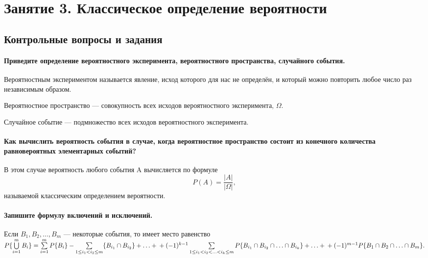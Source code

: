 \chapter*{Занятие 3. Классическое определение вероятности}

\section*{Контрольные вопросы и задания}

\subsubsection*{Приведите определение вероятностного эксперимента, вероятностного пространства, случайного события.}

Вероятностным экспериментом называется явление, исход которого для нас не определён, и который можно повторить любое число раз независимым образом.

Вероятностное пространство --- совокупность всех исходов вероятностного эксперимента, $\Omega$.

Случайное событие --- подмножество всех исходов вероятностного эксперимента.

\subsubsection*{Как вычислить вероятность события в случае, когда вероятностное пространство состоит из конечного количества равновероятных элементарных событий?}

В этом случае вероятность любого события A вычисляется по формуле
$$ P(A) =
\frac{ |A| }{ |\Omega| },$$
называемой классическим определением вероятности.

\subsubsection*{Запишите формулу включений и исключений.}

Если
$ B_1, B_2,  \dotsc , B_m $ --- некоторые события, то имеет место равенство
$ P\{ \bigcup \limits_{i=1}^m B_i \} =
\sum \limits_{i=1}^m P \{ B_i \} -
\sum \limits_{ 1 \leq i_1 < i_2 \leq m } \{ B_{ i_1 } \cap B_{ i_2 } \} + \dotsc + \\
+ (-1)^{k-1} \sum \limits_{ 1 \leq i_1 < i_2 < \dotsc < i_k \leq m } P \{ B_{ i_1 } \cap B_{ i_2 } \cap \dotsc \cap B_{ i_k } \} + \dotsc + \\
+ (-1)^{m-1} P \{ B_1 \cap B_2 \cap \dotsc \cap B_m \}.$

